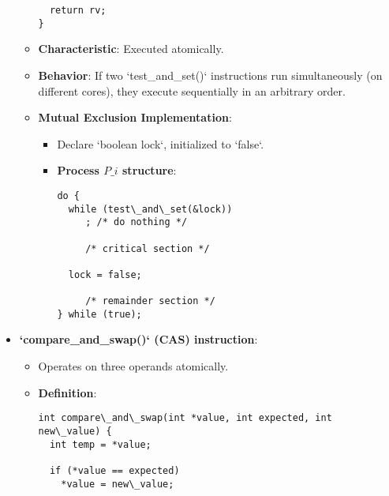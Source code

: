 \begin{itemize}
\begin{itemize}
\begin{verbatim}
  return rv;
}
\end{verbatim}
          \item \textbf{Characteristic}: Executed atomically.
          \item \textbf{Behavior}: If two `test\_and\_set()` instructions run simultaneously (on different cores), they execute sequentially in an arbitrary order.
          \item \textbf{Mutual Exclusion Implementation}:
                \begin{itemize}
                  \item Declare `boolean lock`, initialized to `false`.
                  \item \textbf{Process $P\_i$ structure}:
                        \begin{verbatim}
do {
  while (test\_and\_set(&lock))
     ; /* do nothing */
 
     /* critical section */
 
  lock = false;
 
     /* remainder section */
} while (true);
\end{verbatim}
                \end{itemize}
        \end{itemize}

  \item \textbf{`compare\_and\_swap()` (CAS) instruction}:
        \begin{itemize}
          \item Operates on three operands atomically.
          \item \textbf{Definition}:
                \begin{verbatim}
int compare\_and\_swap(int *value, int expected, int new\_value) {
  int temp = *value;
 
  if (*value == expected)
    *value = new\_value;
 

\end{verbatim}
\end{itemize}
\end{itemize}
